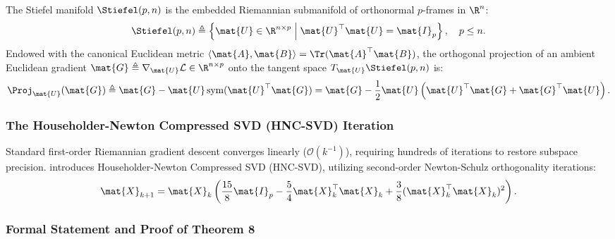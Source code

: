 \begin{definition}
\label{def:stiefel_manifold_sec3}
The Stiefel manifold $\Stiefel(p, n)$ is the embedded Riemannian submanifold of orthonormal $p$-frames in $\R^n$:
\begin{equation}
\Stiefel(p, n) \triangleq \left\{ \mat{U} \in \R^{n \times p} \;\middle|\; \mat{U}^\top \mat{U} = \mat{I}_p \right\}, \quad p \le n.
\label{eq:stiefel_def}
\end{equation}
Endowed with the canonical Euclidean metric $\langle \mat{A}, \mat{B} \rangle = \Tr(\mat{A}^\top \mat{B})$, the orthogonal projection of an ambient Euclidean gradient $\mat{G} \triangleq \nabla_{\mat{U}} \mathcal{L} \in \R^{n \times p}$ onto the tangent space $T_{\mat{U}} \Stiefel(p, n)$ is:
\begin{equation}
\Proj_{\mat{U}}(\mat{G}) \triangleq \mat{G} - \mat{U} \sym(\mat{U}^\top \mat{G}) = \mat{G} - \frac{1}{2} \mat{U} \left( \mat{U}^\top \mat{G} + \mat{G}^\top \mat{U} \right).
\label{eq:stiefel_projector}
\end{equation}
\end{definition}

\subsubsection{The Householder-Newton Compressed SVD (HNC-SVD) Iteration}
Standard first-order Riemannian gradient descent converges linearly ($\mathcal{O}(k^{-1})$), requiring hundreds of iterations to restore subspace precision. \neuralops{} introduces Householder-Newton Compressed SVD (HNC-SVD), utilizing second-order Newton-Schulz orthogonality iterations:
\begin{equation}
\mat{X}_{k+1} = \mat{X}_k \left( \frac{15}{8} \mat{I}_p - \frac{5}{4} \mat{X}_k^\top \mat{X}_k + \frac{3}{8} (\mat{X}_k^\top \mat{X}_k)^2 \right).
\label{eq:newton_schulz_iteration}
\end{equation}

\subsubsection{Formal Statement and Proof of Theorem 8}

